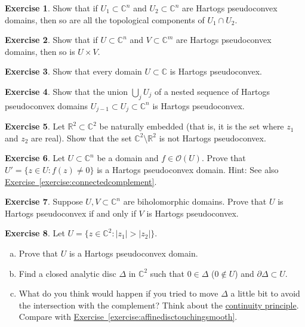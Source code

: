\documentclass[12pt,openany]{book}
\newcommand{\sabs}[1]{\lvert {#1} \rvert}
\newcommand{\C}{{\mathbb{C}}}
\newcommand{\R}{{\mathbb{R}}}
\newcommand{\sO}{{\mathscr{O}}}
\theoremstyle{plain}
\theoremstyle{remark}
\theoremstyle{definition}
\newenvironment{exbox}{%
    \def\FrameCommand{\vrule width 1pt \relax\hspace {10pt}}%
    \MakeFramed {\advance \hsize -\width \FrameRestore }%
}{%
    \endMakeFramed
}
\newenvironment{exparts}{%
    \leavevmode\begin{enumerate}[a),noitemsep,topsep=0pt,parsep=0pt,partopsep=0pt]
}{%
    \end{enumerate}
}
\theoremstyle{exercise}
\newtheorem{exercise}{Exercise}[section]
\theoremstyle{example}
\newcommand{\exerciseref}[1]{\hyperref[#1]{Exercise~\ref*{#1}}}
\begin{document}
\begin{exbox}
\begin{exercise}
Show that if $U_1 \subset \C^n$ and $U_2 \subset \C^n$ are Hartogs
pseudoconvex domains, then so are all the topological components of $U_1 \cap U_2$.
\end{exercise}

\begin{exercise}
Show that if $U \subset \C^n$ and $V \subset \C^m$ are Hartogs
pseudoconvex domains, then so is $U \times V$.
\end{exercise}

\begin{exercise}
Show that every domain $U \subset \C$ is Hartogs pseudoconvex.
\end{exercise}

\begin{exercise} \label{exercise:nestedunions}
Show that the union $\bigcup_j U_j$ of a nested sequence of Hartogs pseudoconvex
domains $U_{j-1} \subset U_j \subset \C^n$ is Hartogs pseudoconvex.
\end{exercise}

\begin{exercise}
Let $\R^2 \subset \C^2$ be naturally embedded (that is, it is the
set where $z_1$ and $z_2$ are real).  Show that the set $\C^2 \setminus
\R^2$ is not Hartogs pseudoconvex.
\end{exercise}

\begin{exercise}
Let $U \subset \C^n$ be a domain and $f \in \sO(U)$.  Prove that
$U' = \bigl\{ z \in U : f(z) \not= 0 \bigr\}$ is a Hartogs pseudoconvex
domain.  Hint: See also \exerciseref{exercise:connectedcomplement}.
\end{exercise}

\begin{exercise} \label{exercise:biholHartogs}
Suppose $U,V \subset \C^n$ are biholomorphic domains.
Prove that $U$ is Hartogs pseudoconvex if and only if $V$ is
Hartogs pseudoconvex.
\end{exercise}

\begin{exercise}
Let $U = \bigl\{ z \in \C^2 : \sabs{z_1} > \sabs{z_2} \bigr\}$.
\begin{exparts}
\item
Prove that $U$ is a Hartogs pseudoconvex domain.
\item
Find a closed analytic disc $\Delta$ in $\C^2$ such that $0 \in \Delta$ ($0
\notin U$)
and $\partial \Delta \subset U$.
\item
What do you think would happen if you tried to move $\Delta$ a
little bit to avoid the intersection with the complement?
Think about the \hyperref[thm:contprinciple]{continuity principle}.
Compare with \exerciseref{exercise:affinedisctouchingsmooth}.
\end{exparts}
\end{exercise}


\end{exbox}
\end{document}
